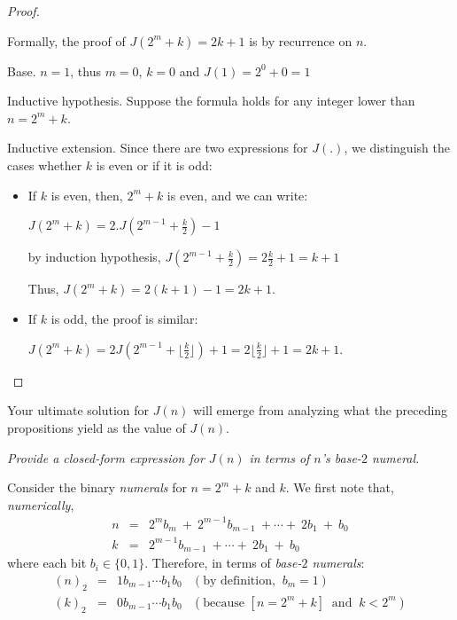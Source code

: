 \begin{itemize}
\begin{proof}
\begin{itemize}
Formally, the proof of $J(2^m+k) = 2k+1$ is by recurrence on $n$.

\noindent
{\sf Base}.
$n=1$, thus $m=0$, $k=0$ and $J(1) = 2^0+0 = 1$
\smallskip

\noindent 
{\sf Inductive hypothesis}.
Suppose the formula holds for any integer lower than $n=2^m+k$.
\smallskip

\noindent 
{\sf Inductive extension}.
Since there are two expressions for $J(.)$, we distinguish the cases whether $k$ is even or if it is odd:
\begin{itemize}
\item If $k$ is even, then, $2^m+k$ is even, and we can write:

$J(2^m+k) = 2.J(2^{m-1}+\frac{k}{2})-1$

by induction hypothesis, $J(2^{m-1} +\frac{k}{2}) = 2\frac{k}{2} +1 = k+1$

Thus, $J(2^m+k) = 2(k+1) -1 = 2k+1$.

\item 
If $k$ is odd, the proof is similar:

$J(2^m+k) = 2J(2^{m-1}+\lfloor \frac{k}{2} \rfloor)+1 = 2\lfloor \frac{k}{2} \rfloor +1 = 2k+1$.
\end{itemize}

\end{itemize}
\end{proof}

Your ultimate solution for $J(n)$ will emerge from analyzing what the preceding propositions yield as the value of $J(n)$.  

{\em Provide a closed-form expression for $J(n)$ in terms of $n$'s base-$2$ numeral.}
\medskip

Consider the binary {\em numerals} for $n = 2^m +k$ and $k$.  We first note that, {\em numerically},
\begin{eqnarray*}
n & = &  2^m b_m \ + \ 2^{m-1} b_{m-1} \ + \cdots + \ 2 b_1 \ + \ b_0 \\
k & = & 2^{m-1}  b_{m-1} \ + \cdots + \ 2 b_1 \ + \ b_0
\end{eqnarray*} 
where each bit $b_i \in \{0,1\}$.  Therefore, in terms of {\em base-$2$ numerals}:
\[ \begin{array}{ccrl}
(n)_2 & = & 1 b_{m-1} \cdots b_1 b_0 & (\mbox{by definition, } \ b_m=1) \\ 
(k)_2 & = & 0 b_{m-1} \cdots b_1 b_0 & (\mbox{because } [n = 2^m +k] \ \mbox{ and } \ k < 2^m)
\end{array}
\]


\end{itemize}

